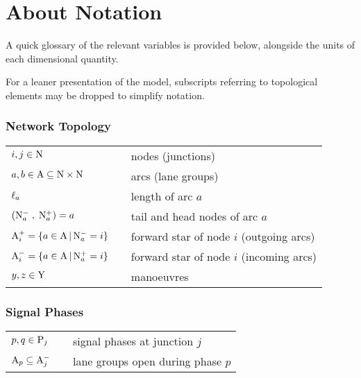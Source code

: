 \pagebreak
\section*{About Notation}
A quick glossary of the relevant variables is provided below, alongside the units of each dimensional quantity.

For a leaner presentation of the model, subscripts referring to
topological elements may be dropped to simplify notation.

\subsubsection*{Network Topology}
\begin{tabu} to \textwidth {X[3,c] X[1,c] X[6,l]}
$i,j \in \mathrm{N}$ & & nodes (junctions) \\[2pt]

$a,b \in \mathrm{A} \subseteq \mathrm{N} \times \mathrm{N} $ & & arcs (lane groups) \\[2pt]

$\ell_a$ &  & length of arc $a$ \\[2pt]

$\left( \mathrm{N}_{a}^{-} \; , \;\mathrm{N}_{a}^{+} \right) = a$ & & tail and head nodes of arc $a$ \\[2pt]

$\mathrm{A}_{i}^{+} = \left\lbrace a \in \mathrm{A} \, | \, \mathrm{N}_{a}^{-} = i \right\rbrace $ & & forward star of node $i$ (outgoing arcs)\\[2pt]

$\mathrm{A}_{i}^{-} = \left\lbrace a \in \mathrm{A} \, | \, \mathrm{N}_{a}^{+} = i \right\rbrace $ & & forward star of node $i$ (incoming arcs)\\[2pt]

$y,z \in \mathrm{Y}$ & & manoeuvres\\

\end{tabu} 


\subsubsection*{Signal Phases}
\begin{tabu} to \textwidth {X[3,c] X[1,c] X[6,l]}
$p,q \in \mathrm{P}_{j}$ & & signal phases at junction $j$\\[2pt]

$\mathrm{A}_{p} \subseteq \mathrm{A}_{j}^{-} $ & & lane groups open during phase $p$ \\[2pt]

\end{tabu} 


